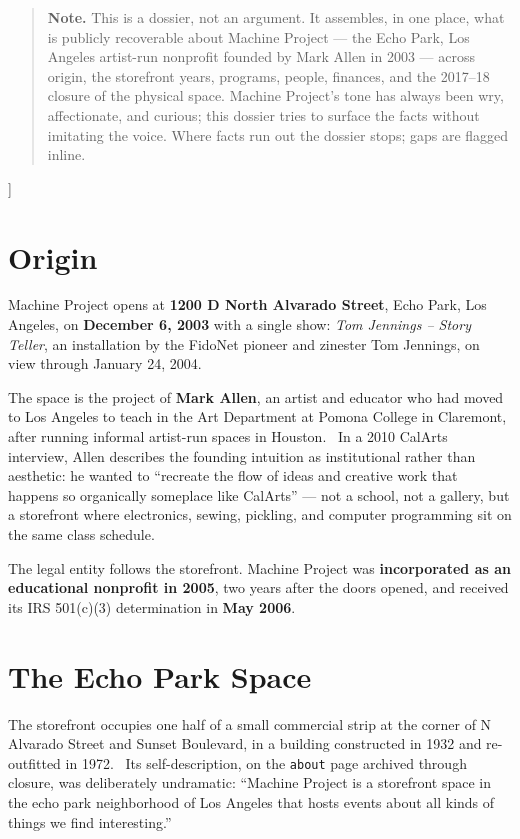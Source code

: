 \documentclass[10pt,letterpaper,twocolumn]{article}
\begin{document}
{\begin{quote}
\small\noindent\textbf{Note.} This is a dossier, not an argument. It assembles, in one place, what is publicly recoverable about Machine Project --- the Echo Park, Los Angeles artist-run nonprofit founded by Mark Allen in 2003 --- across origin, the storefront years, programs, people, finances, and the 2017--18 closure of the physical space. Machine Project's tone has always been wry, affectionate, and curious; this dossier tries to surface the facts without imitating the voice. Where facts run out the dossier stops; gaps are flagged inline.
\end{quote}
\vspace{0.5em}
}]

\section{Origin}

Machine Project opens at \textbf{1200 D North Alvarado Street}, Echo Park, Los Angeles, on \textbf{December 6, 2003} with a single show: \emph{Tom Jennings -- Story Teller}, an installation by the FidoNet pioneer and zinester Tom Jennings, on view through January 24, 2004.~\citep{wikipediamachine,machineproject}

The space is the project of \textbf{Mark Allen}, an artist and educator who had moved to Los Angeles to teach in the Art Department at Pomona College in Claremont, after running informal artist-run spaces in Houston.~\citep{ltimesclosure} In a 2010 CalArts interview, Allen describes the founding intuition as institutional rather than aesthetic: he wanted to ``recreate the flow of ideas and creative work that happens so organically someplace like CalArts'' --- not a school, not a gallery, but a storefront where electronics, sewing, pickling, and computer programming sit on the same class schedule.~\citep{calarts2010}

The legal entity follows the storefront. Machine Project was \textbf{incorporated as an educational nonprofit in 2005}, two years after the doors opened, and received its IRS 501(c)(3) determination in \textbf{May 2006}.~\citep{calarts2010,propublicamachine}

\section{The Echo Park Space}

The storefront occupies one half of a small commercial strip at the corner of N Alvarado Street and Sunset Boulevard, in a building constructed in 1932 and re-outfitted in 1972.~\citep{heavymanners} Its self-description, on the \texttt{about} page archived through closure, was deliberately undramatic: ``Machine Project is a storefront space in the echo park neighborhood of Los Angeles that hosts events about all kinds of things we find interesting.''~\citep{machinearchivalabout}
\end{document}
